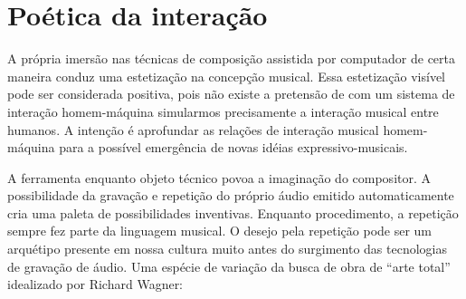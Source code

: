 \documentclass{ppgmus}
\begin{document}
\section{Poética da interação}





A própria imersão nas técnicas de composição assistida por computador de certa
maneira conduz uma estetização na concepção musical. Essa estetização visível
pode ser considerada positiva, pois não existe a pretensão de com um sistema 
de interação homem-máquina simularmos precisamente a interação musical entre
humanos. A intenção é aprofundar as relações de interação musical homem-máquina
para a possível emergência de novas idéias expressivo-musicais. 







A ferramenta enquanto objeto técnico povoa a imaginação do compositor. A possibilidade
da gravação e repetição do próprio áudio emitido automaticamente cria uma paleta de
possibilidades inventivas. Enquanto procedimento, a repetição sempre fez parte da linguagem
musical. O desejo pela repetição pode ser um arquétipo presente em nossa cultura
muito antes do surgimento das tecnologias de gravação de áudio. Uma espécie
de variação da busca de obra de ``arte total'' idealizado por Richard Wagner: 
\end{document}
